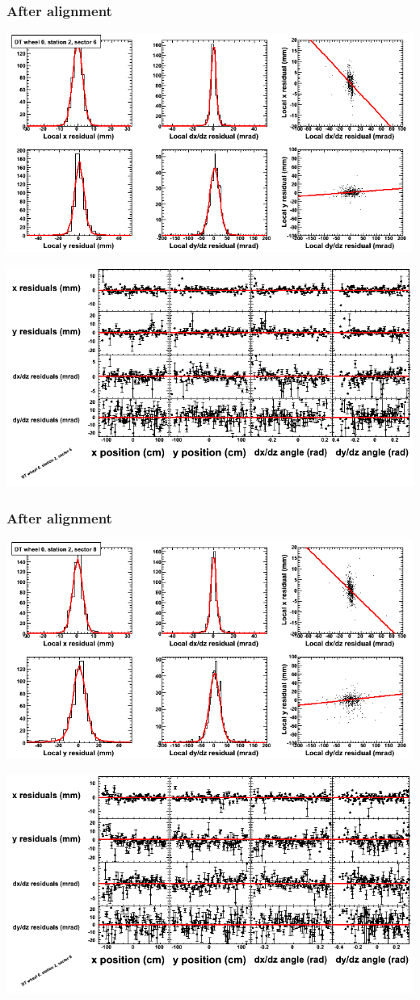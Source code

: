 \documentclass[compress]{beamer}
\begin{document}
\begin{frame}
\frametitle{After alignment}
\includegraphics[width=0.7\linewidth]{NOV4_fitfunctions/MBwhCst2sec06_bellcurves.png}

\includegraphics[width=0.7\linewidth]{NOV4_fitfunctions/MBwhCst2sec06_polynomials.png}
\end{frame}

\begin{frame}
\frametitle{After alignment}
\includegraphics[width=0.7\linewidth]{NOV4_fitfunctions/MBwhCst2sec08_bellcurves.png}

\includegraphics[width=0.7\linewidth]{NOV4_fitfunctions/MBwhCst2sec08_polynomials.png}
\end{frame}
\end{document}
